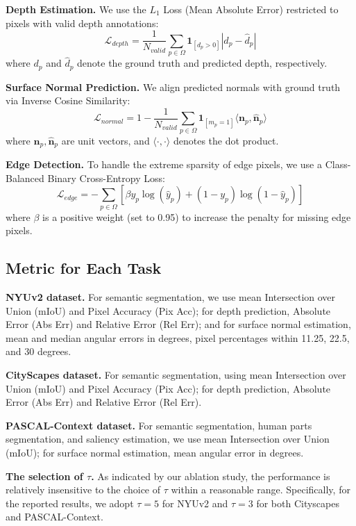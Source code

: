 \documentclass[sigconf]{acmart}
\begin{document}
\noindent \textbf{Depth Estimation.}
We use the $L_1$ Loss (Mean Absolute Error) restricted to pixels with valid depth annotations:
$$\mathcal{L}_{depth} = \frac{1}{N_{valid}} \sum_{p \in \Omega} \mathbf{1}_{[d_p > 0]} | d_p - \hat{d}_p |$$where $d_p$ and $\hat{d}_p$ denote the ground truth and predicted depth, respectively.

\noindent \textbf{Surface Normal Prediction.}
We align predicted normals with ground truth via Inverse Cosine Similarity:
$$\mathcal{L}_{normal} = 1 - \frac{1}{N_{valid}} \sum_{p \in \Omega} \mathbf{1}_{[m_p = 1]} \langle \mathbf{n}_p, \hat{\mathbf{n}}_p \rangle$$where $\mathbf{n}_p, \hat{\mathbf{n}}_p$ are unit vectors, and $\langle \cdot, \cdot \rangle$ denotes the dot product.

\noindent \textbf{Edge Detection.}
To handle the extreme sparsity of edge pixels, we use a Class-Balanced Binary Cross-Entropy Loss:
$$\mathcal{L}_{edge} = - \sum_{p \in \Omega} \left[ \beta y_p \log(\hat{y}_p) + (1-y_p) \log(1-\hat{y}_p) \right]$$
where $\beta$ is a positive weight (set to 0.95) to increase the penalty for missing edge pixels.



\subsection{Metric for Each Task}
\label{appdix:metric}
\noindent \textbf{NYUv2 dataset.} For semantic segmentation, we use mean Intersection over Union (mIoU) and Pixel Accuracy (Pix Acc); for depth prediction, Absolute Error (Abs Err) and Relative Error (Rel Err); and for surface normal estimation, mean and median angular errors in degrees, pixel percentages within 11.25, 22.5, and 30 degrees.


\noindent \textbf{CityScapes dataset.} For semantic segmentation, using mean Intersection over Union (mIoU) and Pixel Accuracy (Pix Acc); for depth prediction, Absolute Error (Abs Err) and Relative Error (Rel Err).

\noindent \textbf{PASCAL-Context dataset.} For semantic segmentation, human parts segmentation, and saliency estimation, we use mean Intersection over Union (mIoU); for surface normal estimation, mean angular error in degrees.


\noindent \textbf{The selection of $\tau$.}
As indicated by our ablation study, the performance is relatively insensitive to the choice of $\tau$ within a reasonable range. Specifically, for the reported results, we adopt $\tau=5$ for NYUv2 and $\tau=3$ for both Cityscapes and PASCAL-Context.
\end{document}
